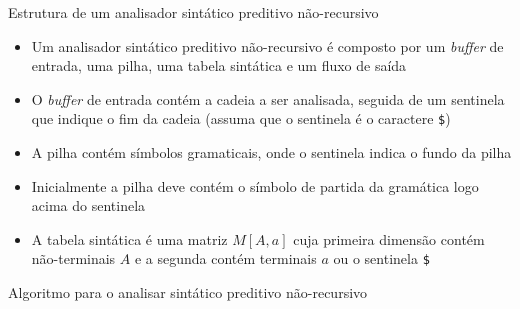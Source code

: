 \begin{frame}[fragile]{Estrutura de um analisador sintático preditivo não-recursivo}

    \begin{itemize}
        \item Um analisador sintático preditivo não-recursivo é composto por um \textit{buffer} de entrada, uma pilha, uma tabela sintática e um fluxo de saída

        \item O \textit{buffer} de entrada contém a cadeia a ser analisada, seguida de um sentinela que indique o fim da cadeia (assuma que o sentinela é o
            caractere \texttt{\$})

        \item A pilha contém símbolos gramaticais, onde o sentinela indica o fundo da pilha

        \item Inicialmente a pilha deve contém o símbolo de partida da gramática logo acima do sentinela
    
        \item A tabela sintática é uma matriz $M[A, a]$ cuja primeira dimensão contém não-terminais $A$ e a segunda contém terminais $a$ ou o sentinela
            \texttt{\$}
    \end{itemize}

\end{frame}

\begin{frame}[fragile]{Algoritmo para o analisar sintático preditivo não-recursivo}

    \begin{algorithmic}[1]

        \vspace{0.1in}

        \Repeat
                \Else
                \EndIf
    \end{algorithmic}

\end{frame}

